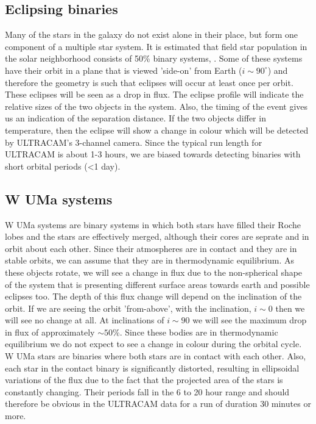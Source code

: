 \subsection{Eclipsing binaries}
Many of the stars in the galaxy do not exist alone in their place, but form one component of a multiple star system. It is estimated that field star population in the solar neighborhood consists of 50\% binary systems, \cite{binaryfraction}. Some of these systems have their orbit in a plane that is viewed 'side-on' from Earth ($i \sim 90^\circ$) and therefore the geometry is such that eclipses will occur at least once per orbit. These eclipses will be seen as a drop in flux. The eclipse profile will indicate the relative sizes of the two objects in the system. Also, the timing of the event gives us an indication of the separation distance. If the two objects differ in temperature, then the eclipse will show a change in colour which will be detected by ULTRACAM's 3-channel camera. Since the typical run length for ULTRACAM is about 1-3 hours, we are biased towards detecting binaries with short orbital periods (\textless 1 day). 

\subsection{{W UMa} systems}
{W UMa} systems are binary systems in which both stars have filled their Roche lobes and the stars are effectively merged, although their cores are seprate and in orbit about each other. Since their atmospheres are in contact and they are in stable orbits, we can assume that they are in thermodynamic equilibrium. As these objects rotate, we will see a change in flux due to the non-spherical shape of the system that is presenting different surface areas towards earth and possible eclipses too. The depth of this flux change will depend on the inclination of the orbit. If we are seeing the orbit 'from-above', with the inclination, $i \sim 0$ then we will see no change at all. At inclinations of $i \sim 90$ we will see the maximum drop in flux of approximately $\sim50\%$. Since these bodies are in thermodynamic equilibrium we do not expect to see a change in colour during the orbital cycle. 
{W UMa} stars are binaries where both stars are in contact with each other. Also, each star in the contact binary is significantly distorted, resulting in ellipsoidal variations of the flux due to the fact that the projected area of the stars is constantly changing. Their periods fall in the 6 to 20 hour range and should therefore be obvious in the ULTRACAM data for a run of duration 30 minutes or more. 

